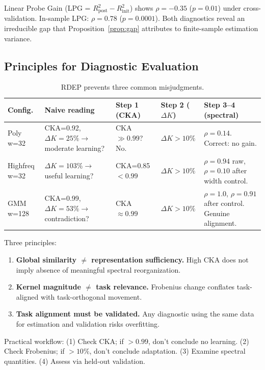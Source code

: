 \documentclass[twoside,11pt]{article}
\begin{document}
Linear Probe Gain (LPG = $R^2_{\text{post}} - R^2_{\text{init}}$) shows $\rho=-0.35$ ($p=0.01$) under cross-validation. In-sample LPG: $\rho=0.78$ ($p=0.0001$). Both diagnostics reveal an irreducible gap that Proposition~\ref{prop:gap} attributes to finite-sample estimation variance.

\subsection{Principles for Diagnostic Evaluation}
\label{sec:principles}

\begin{table}[t]
\centering\small
\caption{RDEP prevents three common misjudgments.}
\label{tab:rdeep_cases}
\begin{tabular}{p{2cm}p{2.2cm}p{2.2cm}p{2.2cm}p{2.2cm}}
\toprule
Config. & Naive reading & Step 1 (CKA) & Step 2 ($\Delta K$) & Step 3--4 (spectral) \\
\midrule
Poly w=32 & CKA=0.92, $\Delta K=25\%\rightarrow$ moderate learning? & CKA $\gg 0.99$? No. & $\Delta K >10\%$ & $\rho=0.14$. Correct: no gain. \\
Highfreq w=32 & $\Delta K=103\%\rightarrow$ useful learning? & CKA=0.85 $<0.99$ & $\Delta K >10\%$ & $\rho=0.94$ raw, $\rho=0.10$ after width control. \\
GMM w=128 & CKA=0.99, $\Delta K=53\%\rightarrow$ contradiction? & CKA $\approx 0.99$ & $\Delta K >10\%$ & $\rho=1.0$, $\rho=0.91$ after control. Genuine alignment. \\
\bottomrule
\end{tabular}
\end{table}

Three principles:
\begin{enumerate}
    \item \textbf{Global similarity $\neq$ representation sufficiency.} High CKA does not imply absence of meaningful spectral reorganization.
    \item \textbf{Kernel magnitude $\neq$ task relevance.} Frobenius change conflates task-aligned with task-orthogonal movement.
    \item \textbf{Task alignment must be validated.} Any diagnostic using the same data for estimation and validation risks overfitting.
\end{enumerate}

Practical workflow: (1) Check CKA; if $>0.99$, don't conclude no learning. (2) Check Frobenius; if $>10\%$, don't conclude adaptation. (3) Examine spectral quantities. (4) Assess via held-out validation.
\end{document}
